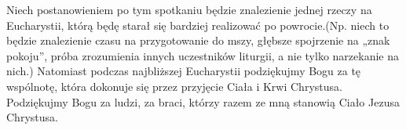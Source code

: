 \documentclass[a5paper,10pt,polish]{book}
\begin{document}
Niech postanowieniem po tym spotkaniu będzie znalezienie jednej rzeczy na Eucharystii, którą będę starał się bardziej realizować po powrocie.(Np. niech to będzie znalezienie czasu na przygotowanie do mszy, głębsze spojrzenie na „znak pokoju”, próba zrozumienia innych uczestników liturgii, a nie tylko narzekanie na nich.) Natomiast podczas najbliższej Eucharystii podziękujmy Bogu za tę wspólnotę, która dokonuje się przez przyjęcie Ciała i Krwi Chrystusa. Podziękujmy Bogu za ludzi, za braci, którzy razem ze mną stanowią Ciało Jezusa Chrystusa.



\renewcommand{\indexname}{Indeks}
\printindex
\end{document}
